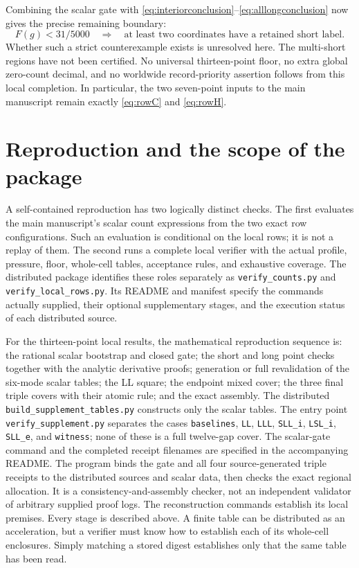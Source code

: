 \documentclass[11pt]{amsart}
\numberwithin{equation}{section}
\begin{document}
Combining the scalar gate with
\eqref{eq:interiorconclusion}--\eqref{eq:alllongconclusion}
now gives the precise remaining boundary:
\begin{equation}\label{eq:remaining}
 F(g)<31/5000\quad\Longrightarrow\quad
 \text{at least two coordinates have a retained short label}.
\end{equation}
Whether such a strict counterexample exists is unresolved here.
The multi-short regions have not been certified. No universal
thirteen-point floor, no extra global zero-count decimal, and no
worldwide record-priority assertion follows from this local
completion. In particular, the two seven-point inputs to the main
manuscript remain exactly \eqref{eq:rowC} and \eqref{eq:rowH}.

\section{Reproduction and the scope of the package}

A self-contained reproduction has two logically distinct checks.
The first evaluates the main manuscript's scalar count expressions
from the two exact row configurations. Such an evaluation is
conditional on the local rows; it is not a replay of them. The
second runs a complete local verifier with the actual profile,
pressure, floor, whole-cell tables, acceptance rules, and exhaustive
coverage. The distributed package identifies these roles separately
as \texttt{verify\_counts.py} and
\texttt{verify\_local\_rows.py}. Its README and manifest specify
the commands actually supplied, their optional supplementary
stages, and the execution status of each distributed source.

For the thirteen-point local results, the mathematical reproduction
sequence is: the rational scalar bootstrap and closed gate; the
short and long point checks together with the analytic derivative
proofs; generation or full revalidation of the six-mode scalar
tables; the LL square; the endpoint mixed cover; the three final
triple covers with their atomic rule; and the exact assembly.
The distributed \texttt{build\_supplement\_tables.py} constructs
only the scalar tables. The entry point
\texttt{verify\_supplement.py} separates the cases
\texttt{baselines}, \texttt{LL}, \texttt{LLL},
\texttt{SLL\_i}, \texttt{LSL\_i}, \texttt{SLL\_e}, and
\texttt{witness}; none of these is a full twelve-gap cover.
The scalar-gate command and the completed receipt filenames are
specified in the accompanying README. The program
 binds the gate and all four
source-generated triple receipts to the distributed sources and
scalar data, then checks the exact regional allocation. It is a
consistency-and-assembly checker, not an independent validator of
arbitrary supplied proof logs. The reconstruction commands establish
its local premises.
Every stage is described above. A finite table can be distributed as an acceleration, but a
verifier must know how to establish each of its whole-cell
enclosures. Simply matching a stored digest establishes only that
the same table has been read.
\end{document}
